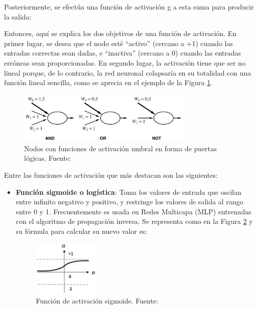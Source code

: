 \begin{itemize}
	Posteriormente, se efectúa una función de activación g a esta suma para producir la salida:
	
	Entonces, aquí se explica los dos objetivos de una función de activación. En primer lugar, se desea que el nodo esté “activo” (cercano a +1) cuando las entradas correctas sean dadas, e “inactiva” (cercano a 0) cuando las entradas erróneas sean proporcionadas. En segundo lugar, la activación tiene que ser no lineal porque, de lo contrario, la red neuronal colapsaría en su totalidad con una función lineal sencilla, como se aprecia en el ejemplo de la Figura \ref{2:fig12}.
	\begin{figure}[h]
		\begin{center}
			\includegraphics[width=0.75\textwidth]{2/figures/rna_activaciones.jpg}
			\caption{Nodos con funciones de activación umbral en forma de puertas lógicas. Fuente: \cite{bk_russell2004intart}}
			\label{2:fig12}
		\end{center}
	\end{figure}
	
	Entre las funciones de activación que más destacan son las siguientes:
	\begin{itemize}
		\item \textbf{Función sigmoide o logística}: Toma los valores de entrada que oscilan entre infinito negativo y positivo, y restringe los valores de salida al rango entre 0 y 1. Frecuentemente es usada en Redes Multicapa (MLP) entrenadas con el algoritmo de propagación inversa. Se representa como en la Figura \ref{2:fig13} y su fórmula para calcular su nuevo valor es:
		\begin{figure}[h]
			\begin{center}
				\includegraphics[width=0.3\textwidth]{2/figures/sigmoide.jpg}
				\caption{Función de activación sigmoide. Fuente: \cite{pr_dorofki2012ann}}
				\label{2:fig13}
			\end{center}
		\end{figure}
		

\end{itemize}
\end{itemize}

